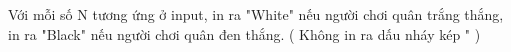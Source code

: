 Với mỗi số N tương ứng ở input, in ra "White" nếu người chơi quân trắng thắng, in ra "Black" nếu người chơi quân đen thắng. ( Không in ra dấu nháy kép " )